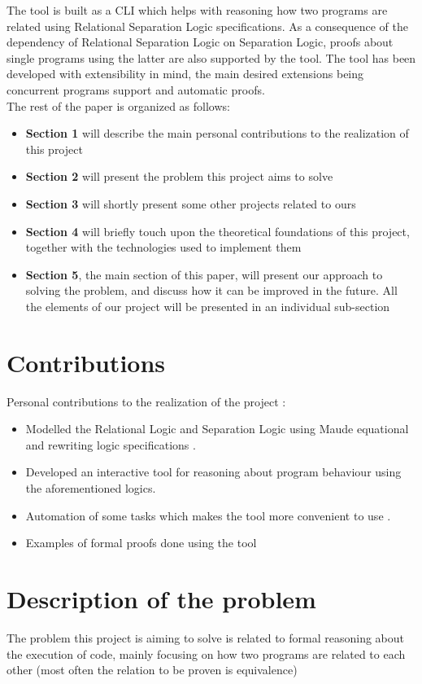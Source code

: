 \documentclass[12pt,a4paper]{article}
\begin{document}
The tool is built as a CLI which helps \cite{primer} \cite{SeparationLogic} \cite{JAVAITP} \cite{REWRITING} \cite{maudeprimer} \cite{manual} \cite{rewrConcurrency} \cite{cyclist} with reasoning how two programs are related using Relational Separation Logic specifications. As a consequence of the dependency of Relational Separation Logic on Separation Logic, proofs about single programs using the latter are also supported by the tool. The tool has been developed with extensibility in mind, the main desired extensions being concurrent programs support and automatic proofs. \\

The rest of the paper is organized as follows: 
\begin{itemize}
	\item {\textbf{Section 1} will describe the main personal contributions to the realization of this project}
	\item {\textbf{Section 2} will present the problem this project aims to solve}
	\item {\textbf{Section 3} will shortly present some other projects related to ours}
	\item {\textbf{Section 4} will briefly touch upon the theoretical foundations of this project, together with the technologies used to implement them}
	\item {\textbf{Section 5}, the main section of this paper, will present our approach to solving the problem, and discuss how it can be improved in the future. All the elements of our project will be presented in an individual sub-section}
\end{itemize}
\section{Contributions}
Personal contributions to the realization of the project : 
\begin{itemize}
	\item Modelled the Relational Logic and Separation Logic using Maude equational and rewriting logic specifications . 
	\item Developed an interactive tool for reasoning about program behaviour using the aforementioned logics.
	\item Automation of some tasks which makes the tool more convenient to use .
	\item Examples of formal proofs done using the tool
\end{itemize}
\section{Description of the problem}
The problem this project is aiming to solve is related to formal reasoning about the execution of code, mainly focusing on how two programs are related to each other (most often the relation to be proven is equivalence)\\
\end{document}
